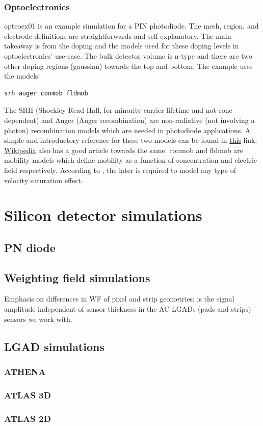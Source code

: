 \documentclass[11pt]{article}
\begin{document}
\subsubsection{Optoelectronics}
opteoex01 is an example simulation for a PIN photodiode. The mesh, region, and electrode definitions are straightforwards and self-explanatory. The main takeaway is from the doping and the models used for these doping levels in optoelectronics' use-case. 
\newline The bulk detector volume is n-type and there are two other doping regions (gaussian) towards the top and bottom. 
\newline The example uses the models: \begin{verbatim}srh auger conmob fldmob \end{verbatim}
The SRH (Shockley-Read-Hall, for minority carrier lifetime and not conc dependent) and Auger (Auger recombination) are non-radiative (not involving a photon) recombination models which are needed in photodiode applications. A simple and introductory reference for these two models can be found in \href{https://www.pveducation.org/pvcdrom/pn-junctions/types-of-recombination}{this} link. \href{ https://en.wikipedia.org/wiki/Carrier_generation_and_recombination}{Wikipedia} also has a good article towards the same. conmob and fldmob are mobility models which define mobility as a function of concentration and electric field respectively. According to \cite{silvaco-atlas}, the later is required to model any type of velocity saturation effect.

\section{Silicon detector simulations}
\subsection{PN diode}

\subsection{Weighting field simulations}
Emphasis on differences in WF of pixel and strip geometries; is the signal amplitude independent of sensor thickness in the AC-LGADs (pads and strips) sensors we work with.
\subsection{LGAD simulations}
\subsubsection{ATHENA}
\subsubsection{ATLAS 3D}
\subsubsection{ATLAS 2D}


\subsection{}

\end{document}
